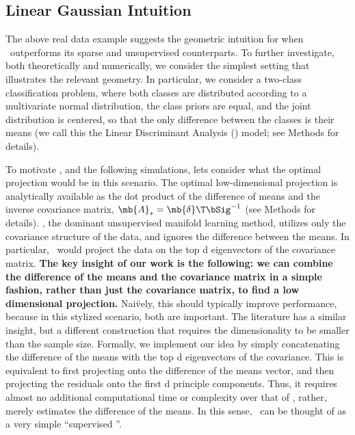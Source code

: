 \documentclass[10pt]{article}
\begin{document}
\subsection*{Linear Gaussian Intuition}

The above real data example suggests the geometric intuition for when \Lol~outperforms its sparse and unsupervised counterparts.  To further investigate, both theoretically and numerically, we consider the simplest setting that illustrates the relevant geometry.  In particular, we consider a two-class classification problem, where both classes are distributed according to a multivariate normal distribution, the class priors are equal, and the joint distribution is centered, so that the only difference between the classes is their means (we call this the Linear Discriminant Analysis (\Lda) model; see Methods for details).  




To motivate \Lol, and the following simulations, lets consider what the optimal projection would be in this scenario. The optimal low-dimensional projection is analytically available as the dot product of the difference of means and the inverse covariance matrix, $\mb{A}_*=\mb{\delta}\T \bSig^{-1}$ \cite{Bickel2004a} (see Methods for details).  
\Pca, the dominant unsupervised manifold learning method, utilizes only the covariance structure of the data, and ignores the difference between the means.  
In particular, \Pca~would project the data on the top d eigenvectors of the  covariance matrix.
\textbf{The key insight of our work is the following: we can combine the difference of the means and the covariance matrix in a simple fashion, rather than just the covariance matrix, to find a low dimensional projection.}  
Nai\"vely, this should typically improve performance, because in this stylized scenario, both are important. The  literature has a similar insight, but a different construction that requires the dimensionality to be smaller than the sample size.  Formally, we implement our idea by simply concatenating the difference of the means with the top d eigenvectors of the  covariance. 
This is equivalent to first projecting onto the difference of the means vector, and then projecting the residuals onto the first d principle components. 
Thus, it requires almost no additional computational time or complexity over that of \Pca, rather, merely estimates the difference of the means.  
In this sense, \Lol~can be thought of as a very simple  ``supervised \Pca''.  
\end{document}
